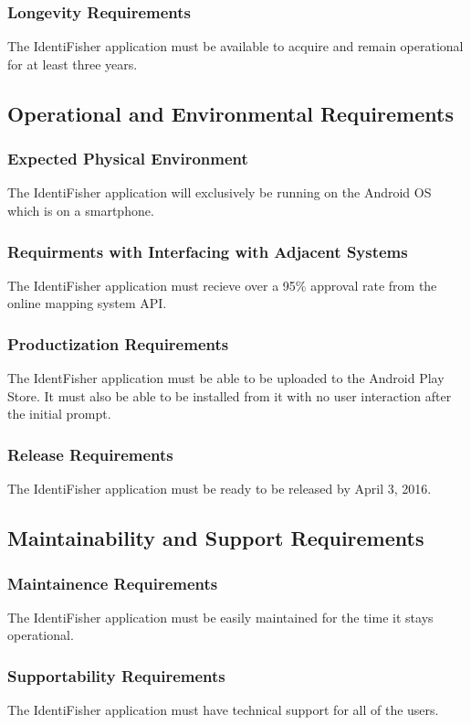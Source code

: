 \documentclass{article}
\begin{document}
\subsubsection{Longevity Requirements}
The IdentiFisher application must be available to acquire and remain operational for at least three years.

\subsection{Operational and Environmental Requirements}
\subsubsection{Expected Physical Environment}
The IdentiFisher application will exclusively be running on the Android OS which is on a smartphone.
\subsubsection{Requirments with Interfacing with Adjacent Systems}
The IdentiFisher application must recieve over a 95\% approval rate from the online mapping system API.
\subsubsection{Productization Requirements}
The IdentFisher application must be able to be uploaded to the Android Play Store. It must also be able to be installed from it with no user interaction after the initial prompt.
\subsubsection{Release Requirements}
The IdentiFisher application must be ready to be released by April 3, 2016.

\subsection{Maintainability and Support Requirements}
\subsubsection{Maintainence Requirements}
The IdentiFisher application must be easily maintained for the time it stays operational.
\subsubsection{Supportability Requirements}
The IdentiFisher application must have technical support for all of the users.
\end{document}
